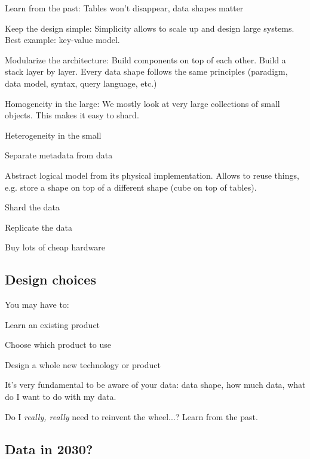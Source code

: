 \documentclass[11pt,oneside,a4paper]{article}
\begin{document}
{\begin{compactenum}
\item Learn from the past: Tables won't disappear, data shapes matter
\item Keep the design simple: Simplicity allows to scale up and design large systems. Best example: key-value model.
\item Modularize the architecture: Build components on top of each other. Build a stack layer by layer. Every data shape follows the same principles (paradigm, data model, syntax, query language, etc.)
\item Homogeneity in the large: We mostly look at very large collections of small objects. This makes it easy to shard.
\item Heterogeneity in the small
\item Separate metadata from data
\item Abstract logical model from its physical implementation. Allows to reuse things, e.g. store a shape on top of a different shape (cube on top of tables).
\item Shard the data
\item Replicate the data
\item Buy lots of cheap hardware
\end{compactenum}

\subsection{Design choices}

You may have to:

\begin{compactitem}
\item Learn an existing product
\item Choose which product to use
\item Design a whole new technology or product
\end{compactitem}

It's very fundamental to be aware of your data: data shape, how much data, what do I want to do with my data.

Do I \textit{really, really} need to reinvent the wheel...? Learn from the past.\\

\subsection{Data in 2030?}

}
\end{document}
